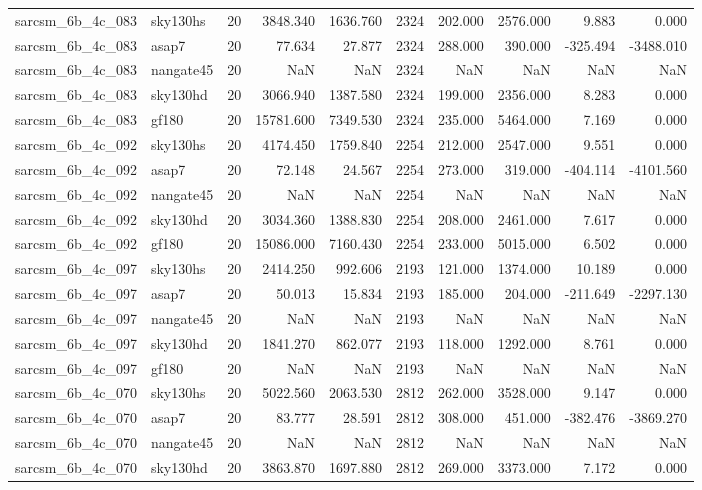 \begin{tabular}{llrrrrrrrr}
sarcsm\_6b\_4c\_083 & sky130hs & 20 & 3848.340 & 1636.760 & 2324 & 202.000 & 2576.000 & 9.883 & 0.000 \\
sarcsm\_6b\_4c\_083 & asap7 & 20 & 77.634 & 27.877 & 2324 & 288.000 & 390.000 & -325.494 & -3488.010 \\
sarcsm\_6b\_4c\_083 & nangate45 & 20 & NaN & NaN & 2324 & NaN & NaN & NaN & NaN \\
sarcsm\_6b\_4c\_083 & sky130hd & 20 & 3066.940 & 1387.580 & 2324 & 199.000 & 2356.000 & 8.283 & 0.000 \\
sarcsm\_6b\_4c\_083 & gf180 & 20 & 15781.600 & 7349.530 & 2324 & 235.000 & 5464.000 & 7.169 & 0.000 \\
sarcsm\_6b\_4c\_092 & sky130hs & 20 & 4174.450 & 1759.840 & 2254 & 212.000 & 2547.000 & 9.551 & 0.000 \\
sarcsm\_6b\_4c\_092 & asap7 & 20 & 72.148 & 24.567 & 2254 & 273.000 & 319.000 & -404.114 & -4101.560 \\
sarcsm\_6b\_4c\_092 & nangate45 & 20 & NaN & NaN & 2254 & NaN & NaN & NaN & NaN \\
sarcsm\_6b\_4c\_092 & sky130hd & 20 & 3034.360 & 1388.830 & 2254 & 208.000 & 2461.000 & 7.617 & 0.000 \\
sarcsm\_6b\_4c\_092 & gf180 & 20 & 15086.000 & 7160.430 & 2254 & 233.000 & 5015.000 & 6.502 & 0.000 \\
sarcsm\_6b\_4c\_097 & sky130hs & 20 & 2414.250 & 992.606 & 2193 & 121.000 & 1374.000 & 10.189 & 0.000 \\
sarcsm\_6b\_4c\_097 & asap7 & 20 & 50.013 & 15.834 & 2193 & 185.000 & 204.000 & -211.649 & -2297.130 \\
sarcsm\_6b\_4c\_097 & nangate45 & 20 & NaN & NaN & 2193 & NaN & NaN & NaN & NaN \\
sarcsm\_6b\_4c\_097 & sky130hd & 20 & 1841.270 & 862.077 & 2193 & 118.000 & 1292.000 & 8.761 & 0.000 \\
sarcsm\_6b\_4c\_097 & gf180 & 20 & NaN & NaN & 2193 & NaN & NaN & NaN & NaN \\
sarcsm\_6b\_4c\_070 & sky130hs & 20 & 5022.560 & 2063.530 & 2812 & 262.000 & 3528.000 & 9.147 & 0.000 \\
sarcsm\_6b\_4c\_070 & asap7 & 20 & 83.777 & 28.591 & 2812 & 308.000 & 451.000 & -382.476 & -3869.270 \\
sarcsm\_6b\_4c\_070 & nangate45 & 20 & NaN & NaN & 2812 & NaN & NaN & NaN & NaN \\
sarcsm\_6b\_4c\_070 & sky130hd & 20 & 3863.870 & 1697.880 & 2812 & 269.000 & 3373.000 & 7.172 & 0.000 \\

\end{tabular}
